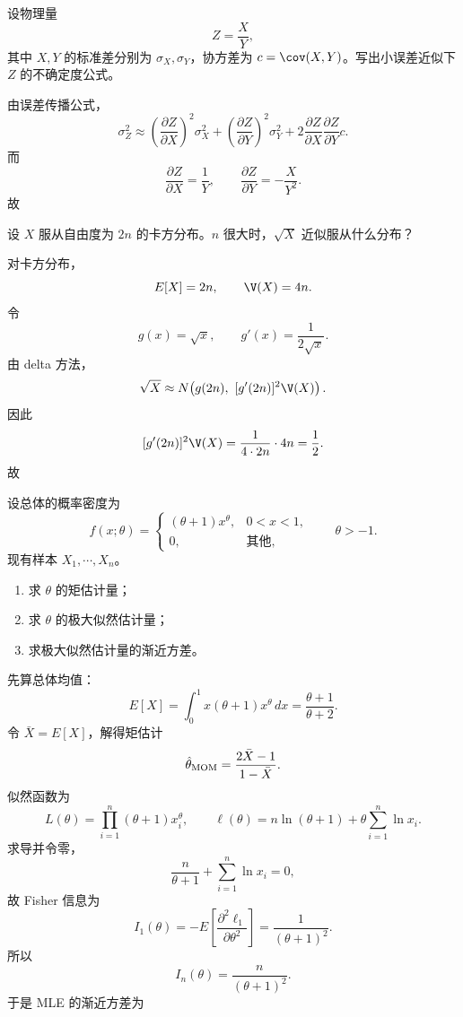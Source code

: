 ﻿

\begin{question}
设物理量
\[
Z=\frac{X}{Y},
\]
其中 $X,Y$ 的标准差分别为 $\sigma_X,\sigma_Y$，协方差为 $c=\cov(X,Y)$。写出小误差近似下 $Z$ 的不确定度公式。
\begin{solution}
由误差传播公式，
\[
\sigma_Z^2\approx
\left(\frac{\partial Z}{\partial X}\right)^2\sigma_X^2+
\left(\frac{\partial Z}{\partial Y}\right)^2\sigma_Y^2+
2\frac{\partial Z}{\partial X}\frac{\partial Z}{\partial Y}c.
\]
而
\[
\frac{\partial Z}{\partial X}=\frac1Y,\qquad
\frac{\partial Z}{\partial Y}=-\frac{X}{Y^2}.
\]
故
\end{solution}
\end{question}

\begin{question}
设 $X$ 服从自由度为 $2n$ 的卡方分布。$n$ 很大时，$\sqrt{X}$ 近似服从什么分布？
\begin{solution}
对卡方分布，
\[
E[X]=2n,\qquad \V(X)=4n.
\]
令
\[
g(x)=\sqrt{x},
\qquad g'(x)=\frac{1}{2\sqrt{x}}.
\]
由 delta 方法，
\[
\sqrt{X}\approx N\!\left(g(2n),\ [g'(2n)]^2\V(X)\right).
\]
因此
\[
[g'(2n)]^2\V(X)
=\frac{1}{4\cdot 2n}\cdot 4n=\frac12.
\]
故
\end{solution}
\end{question}

\begin{question}
设总体的概率密度为
\[
f(x;\theta)=\begin{cases}
(\theta+1)x^\theta,&0<x<1,\\
0,&\text{其他},
\end{cases}
\qquad \theta>-1.
\]
现有样本 $X_1,\cdots,X_n$。
\begin{enumerate}
\item 求 $\theta$ 的矩估计量；
\item 求 $\theta$ 的极大似然估计量；
\item 求极大似然估计量的渐近方差。
\end{enumerate}
\begin{solution}
先算总体均值：
\[
E[X]=\int_0^1 x(\theta+1)x^\theta\,dx
=\frac{\theta+1}{\theta+2}.
\]
令 $\bar X=E[X]$，解得矩估计
\[
\hat\theta_{\rm MOM}=\frac{2\bar X-1}{1-\bar X}.
\]
似然函数为
\[
L(\theta)=\prod_{i=1}^n (\theta+1)x_i^\theta,
\qquad
\ell(\theta)=n\ln(\theta+1)+\theta\sum_{i=1}^n\ln x_i.
\]
求导并令零，
\[
\frac{n}{\theta+1}+\sum_{i=1}^n \ln x_i=0,
\]
故
Fisher 信息为
\[
I_1(\theta)=-E\!\left[\frac{\partial^2 \ell_1}{\partial \theta^2}\right]
=\frac{1}{(\theta+1)^2}.
\]
所以
\[
I_n(\theta)=\frac{n}{(\theta+1)^2}.
\]
于是 MLE 的渐近方差为
\end{solution}
\end{question}

